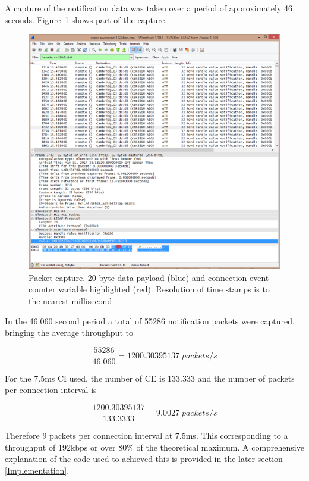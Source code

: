 \documentclass[]{article}
\begin{document}
A capture of the notification data was taken over a period of approximately 46 seconds. Figure~\ref{fig:wireshark} shows part of the capture. 

\begin{figure}[h]
	\begin{center}
		\includegraphics[width = \textwidth]{wireshark}
	\end{center}
	\caption{Packet capture. 20 byte data payload (blue) and connection event counter variable highlighted (red). Resolution of time stamps is to the nearest millisecond}
	\label{fig:wireshark}
\end{figure}

In the 46.060 second period a total of 55286 notification packets were captured, bringing the average throughput to


\begin{displaymath}
\frac{55286}{46.060} = 1200.30395137\; packets/s
\end{displaymath}

For the 7.5ms \ac{CI} used, the number of \ac{CE} is 133.333 and the number of packets per connection interval is

\begin{displaymath}
\frac{1200.30395137}{133.3333} = 9.0027\; packets/s
\end{displaymath}

Therefore 9 packets per connection interval at 7.5ms. This corresponding to a throughput of 192kbps or over 80\% of the theoretical maximum. A comprehensive explanation of the code used to achieved this is provided in the later section \ref{Implementation}. 
\end{document}
